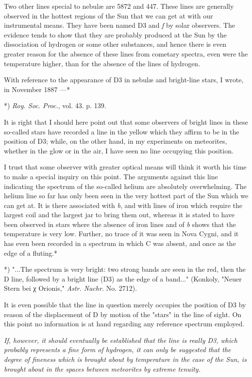 \documentclass[a4paper, 12pt, oneside, polutonikogreek, english]{article}
\begin{document}
Two other lines special to nebulæ are 5872 and 447. These lines are generally observed in the hottest regions of the Sun that we can get at with our instrumental means. They have been named D3 and \emph{f} by solar observers. The evidence tends to show that they are probably produced at the Sun by the dissociation of hydrogen or some other substances, and hence there is even greater reason for the absence of these lines from cometary spectra, even were the temperature higher, than for the absence of the lines of hydrogen.

With reference to the appearance of D3 in nebulæ and bright-line stars, I wrote, in November 1887 ---*

*) \emph{Roy. Soc. Proc.}, vol. 43. p. 139.

It is right that I should here point out that some observers of bright lines in these so-called stars have recorded a line in the yellow which they affirm to be in the position of D3; while, on the other hand, in my experiments on meteorites, whether in the glow or in the air, I have seen no line occupying this position.

I trust that some observer with greater optical means will think it worth his time to make a special inquiry on this point. The arguments against this line indicating the spectrum of the so-called helium are absolutely overwhelming. The helium line so far has only been seen in the very hottest part of the Sun which we can get at. It is there associated with \emph{b}, and with lines of iron which require the largest coil and the largest jar to bring them out, whereas it is stated to have been observed in stars where the absence of iron lines and of \emph{b} shows that the temperature is very low. Further, no trace of it was seen in Nova Cygni, and it has even been recorded in a spectrum in which C was absent, and once as the edge of a fluting.*

*) "...The spectrum is very bright: two strong bands are seen in the red, then the D line, followed by a bright line (D3) as the edge of a band..." (Konkoly, "Neuer Stern bei χ Orionis," \emph{Astr. Nachr.} No. 2712).

It is even possible that the line in question merely occupies the position of D3 by reason of the displacement of D by motion of the "stars" in the line of sight. On this point no information is at hand regarding any reference spectrum employed.

\emph{If, however, it should eventually be established that the line is really D3, which probably represents a fine form of hydrogen, it can only be suggested that the degree of fineness which is brought about by temperature in the case of the Sun, is brought about in the spaces between meteorites by extreme tenuity.}
\end{document}
